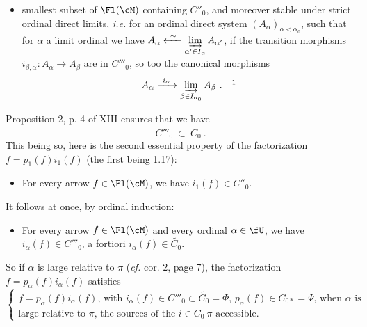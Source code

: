 \setcounter{footnote}{1}%
\begin{itemize}[leftmargin=10em, labelwidth=9em, labelsep=1em, align=left]
\item[(1.19)\hfill $C'''_0 \ = $] smallest subset of $\Fl(\cM)$ containing $C''_0$, and moreover stable under strict ordinal direct limits, \textit{i.e.} for an ordinal direct system $(A_\alpha)_{\alpha<\alpha_0}$, such that for $\alpha$ a limit ordinal we have $A_\alpha \xleftarrow{\ \sim\ } \varinjlim\limits_{\alpha' \in I_\alpha} A_{\alpha'}$, if the transition morphisms $i_{\beta,\alpha} : A_\alpha \longrightarrow A_\beta$ are in $C'''_0$, so too the canonical morphisms
\[
A_\alpha \xrightarrow{\ i_\alpha\ } \varinjlim_{\beta \in I_{\alpha_0}} A_\beta \ . \quad \footnotemark
\]
\end{itemize}


Proposition 2, p. 4 of XIII ensures that we have
\[
C'''_0 \ \subset \ \widetilde{C_0} \ .
\]
This being so, here is the second essential property of the factorization $f = p_1(f)i_1(f)$ (the first being 1.17):

\begin{itemize}[leftmargin=5em, labelwidth=4em, labelsep=1em, align=left]
\item[(1.20)] \qquad\qquad For every arrow $f \in \Fl(\cM)$, we have $i_1(f) \in C''_0$.
\end{itemize}

It follows at once, by ordinal induction:

\begin{itemize}[leftmargin=5em, labelwidth=4em, labelsep=1em, align=left]
\item[(1.21)] \qquad For every arrow $f \in \Fl(\cM)$ and every ordinal $\alpha \in \fU$, we have $i_\alpha(f) \in C'''_0$, a fortiori $i_\alpha(f) \in \widetilde{C_0}$.
\end{itemize}

So if $\alpha$ is large relative to $\pi$ (\textit{cf.} cor. 2, page 7), the factorization $f = p_\alpha(f)i_\alpha(f)$ satisfies
\[
\left\{
\begin{array}{l}
f = p_\alpha(f)i_\alpha(f)\text{, with } i_\alpha(f) \in C'''_0 \subset \widetilde{C_0} = \Phi \text{, } p_\alpha(f) \in C_{0*} = \Psi \text{, when } \alpha \text{ is}\\
\text{large relative to } \pi\text{, the sources of the } i \in C_0 \ \pi\text{-accessible.}
\end{array}
\right.
\tag*{(1.22)}
\]

